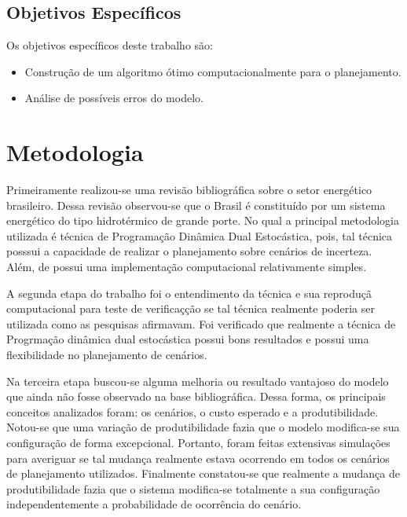 \subsection{Objetivos Espec\'ificos}
Os objetivos espec\'ificos deste trabalho s\~ao:
\begin{itemize}
	\item Constru\c c\~ao de um algoritmo \'otimo  computacionalmente para o planejamento. 
	\item An\'alise de poss\'iveis erros do modelo.
\end{itemize}
\section{Metodologia}
Primeiramente realizou-se uma revis\~ao bibliogr\'afica sobre o setor energ\'etico brasileiro. Dessa revis\~ao
observou-se que o Brasil \'e constitu\'ido por um sistema energ\'etico do tipo hidrot\'ermico de grande porte. No qual a
principal metodologia utilizada \'e t\'ecnica de Programa\c c\~ao Din\^amica Dual Estoc\'astica, pois, tal t\'ecnica
posssui a capacidade de realizar o planejamento sobre cen\'arios de incerteza. Al\'em, de possui uma implementa\c c\~ao
computacional relativamente simples.

A segunda etapa do trabalho foi o entendimento da t\'ecnica e sua reprodu\c c\~a computacional para teste de verifica\c
c\c c\~ao se tal t\'ecnica realmente poderia ser utilizada como as pesquisas afirmavam. Foi verificado que realmente a
t\'ecnica de Progrma\c c\~ao din\^amica dual estoc\'astica possui bons resultados e possui uma flexibilidade no
planejamento de cen\'arios. 

Na terceira etapa buscou-se alguma melhoria ou resultado vantajoso do modelo que ainda n\~ao fosse  observado na base
bibliogr\'afica. Dessa forma, os principais conceitos analizados foram: os cen\'arios, o custo esperado e a
produtibilidade. Notou-se que uma varia\c c\~ao de produtibilidade fazia que o modelo modifica-se sua configura\c c\~ao
de forma excepcional. Portanto, foram feitas extensivas simula\c c\~oes para averiguar se tal mudan\c ca realmente
estava ocorrendo em todos os cen\'arios de planejamento  utilizados. Finalmente constatou-se que realmente a mudan\c ca
de produtibilidade fazia que o sistema modifica-se totalmente a sua configura\c c\~ao independentemente a probabilidade
de ocorr\^encia do cen\'ario.

